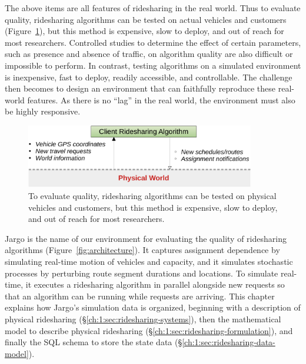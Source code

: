 The above items are all features of ridesharing in the real world.  Thus to
evaluate quality, ridesharing algorithms can be tested on actual vehicles and
customers (Figure~\ref{fig:physical}), but this method is expensive, slow to
deploy, and out of reach for most researchers. Controlled studies to determine
the effect of certain parameters, such as presence and absence of traffic, on
algorithm quality are also difficult or impossible to perform. In contrast,
testing algorithms on a simulated environment is inexpensive, fast to deploy,
readily accessible, and controllable. The challenge then becomes to design an
environment that can faithfully reproduce these real-world features. As there
is no ``lag'' in the real world, the environment must also be highly
responsive.

\begin{figure}[h]
\centering
\includegraphics[width=100mm]{fig/physical}
\caption{To evaluate quality, ridesharing algorithms can be tested on physical
vehicles and customers, but this method is expensive, slow to deploy, and out
of reach for most researchers.}
\label{fig:physical}
\end{figure}

Jargo is the name of our environment for evaluating the quality of ridesharing
algorithms (Figure~\ref{fig:architecture}). It captures assignment dependence
by simulating real-time motion of vehicles and capacity, and it simulates
stochastic processes by perturbing route segment durations and locations. To
simulate real-time, it executes a ridesharing algorithm in parallel alongside
new requests so that an algorithm can be running while requests are arriving.
This chapter explains how Jargo's simulation data is organized, beginning with
a description of physical ridesharing (\S\ref{ch:1:sec:ridesharing-systems}),
then the mathematical model to describe physical ridesharing
(\S\ref{ch:1:sec:ridesharing-formulation}), and finally the SQL schema to store
the state data (\S\ref{ch:1:sec:ridesharing-data-model}).

